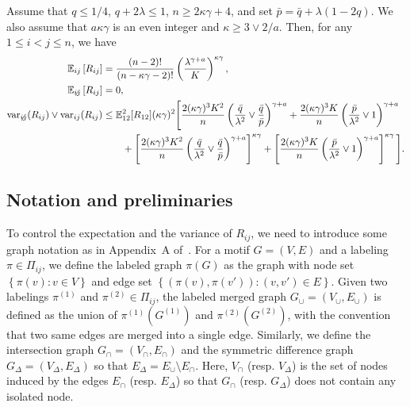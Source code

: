 \documentclass[final]{colt2026}
\newcommand{\1}{\mathbf{1}}
\newcommand{\bbE}{\mathbb{E}}
\newcommand{\ac}[1]{\left\{#1\right\}}
\newcommand{\cro}[1]{\left[#1\right]}
\begin{document}
\begin{proposition}\label{lem:blow_up}
Assume that $q\leq 1/4$, $q+2\lambda \leq 1$, $n\geq 2\kappa\gamma +4$, and set $\bar p=\bar q+\lambda(1-2q)$. We also assume that $a\kappa \gamma$ is an even integer and $\kappa\geq 3\vee 2/a$. 
Then, for any $1\leq i< j\leq n$, we have 
\begin{align}
\bbE_{ij}\cro{R_{ij}}&={(n-2)!\over (n-\kappa\gamma-2)!} \left({\lambda^{ \gamma + a } \over K}\right)^{\kappa \gamma }, \label{eq:mean:12:blow-up}\\
\bbE_{\not ij}\cro{R_{ij}}&= 0, \label{eq:mean:not12:blow-up}\\
 \mathrm{var}_{\not ij}(R_{ij})\vee \mathrm{var}_{ij}(R_{ij}) & \leq \bbE^2_{12}[R_{12}](\kappa\gamma)^2 \Bigg[\frac{2(\kappa \gamma)^{3} K^2 } {n}  \left(\frac{\bar{q}}{\lambda^2}\vee \frac{\bar{q}}{\bar p } \right)^{\gamma + a}  + \frac{2(\kappa \gamma)^{3} K } {n} \left(\frac{\bar{p}}{\lambda^2}\vee 1 \right)^{\gamma + a} \nonumber  \\& \quad \quad  + \left[\frac{2(\kappa \gamma)^{3} K^2 } {n}   \left(\frac{\bar{q}}{\lambda^2}\vee \frac{\bar{q}}{\bar p } \right)^{\gamma + a}\right]^{\kappa \gamma}  + \left[\frac{2(\kappa \gamma)^{3} K } {n} \left(\frac{\bar{p}}{\lambda^2}\vee 1 \right)^{\gamma + a}\right]^{\kappa \gamma}   \Bigg] . 
\label{eq:var:12:blow-up}
\end{align}
\end{proposition}




\subsection{Notation and preliminaries}




To control the expectation and the variance of $R_{ij}$, we need to introduce some graph notation as in Appendix~A of~\cite{carpentier2025phase}.
For a motif $G=(V,E)$ and a labeling $\pi\in\Pi_{ij}$, we define the labeled graph $\pi(G)$ as the graph with node set $\ac{\pi(v):v\in V}$ and edge set $\ac{(\pi(v),\pi(v')):(v,v')\in E}$. Given two labelings $\pi^{(1)}$ and $\pi^{(2)}\in \Pi_{ij}$, the labeled merged graph $G_{\cup}=(V_{\cup},E_{\cup})$ is defined as the union of $\pi^{(1)}(G^{(1)})$ and $\pi^{(2)}(G^{(2)})$, with the convention that two same edges are merged into a single edge. Similarly,  we define the  intersection graph  $G_{\cap}=(V_{\cap},E_{\cap})$ and the  symmetric difference graph $G_{\Delta}=(V_{\Delta},E_{\Delta})$ so that $E_{\Delta}=E_{\cup}\setminus E_{\cap}$. Here, $V_{\cap}$ (resp. $V_{\Delta}$) is the set of nodes induced by the edges $E_{\cap}$ (resp. $E_{\Delta}$) so that $G_{\cap}$ (resp. $G_{\Delta}$) does not contain any isolated node. 
\end{document}

